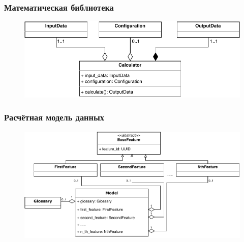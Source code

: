 \begin{frame}
\frametitle{Математическая библиотека}
\begin{figure}
    \includegraphics[scale=.8]{pictures/architecture/math_classes}
\end{figure}
\end{frame}

\begin{frame}
\frametitle{Расчётная модель данных}
\begin{figure}
    \includegraphics[scale=.7]{pictures/architecture/model_classes}
\end{figure}
\end{frame}
